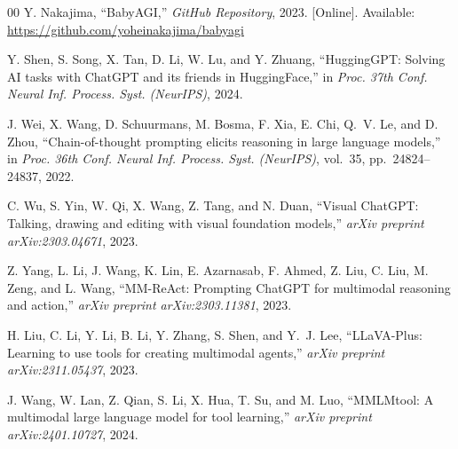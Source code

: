 \documentclass[conference]{IEEEtran}
\begin{document}
\begin{thebibliography}{00}
Y. Nakajima, ``BabyAGI,'' \textit{GitHub Repository}, 2023. [Online]. Available: \url{https://github.com/yoheinakajima/babyagi}

Y. Shen, S. Song, X. Tan, D. Li, W. Lu, and Y. Zhuang, ``HuggingGPT: Solving AI tasks with ChatGPT and its friends in HuggingFace,'' in \textit{Proc. 37th Conf. Neural Inf. Process. Syst. (NeurIPS)}, 2024.

J. Wei, X. Wang, D. Schuurmans, M. Bosma, F. Xia, E. Chi, Q.~V. Le, and D. Zhou, ``Chain-of-thought prompting elicits reasoning in large language models,'' in \textit{Proc. 36th Conf. Neural Inf. Process. Syst. (NeurIPS)}, vol.~35, pp.~24824--24837, 2022.

C. Wu, S. Yin, W. Qi, X. Wang, Z. Tang, and N. Duan, ``Visual ChatGPT: Talking, drawing and editing with visual foundation models,'' \textit{arXiv preprint arXiv:2303.04671}, 2023.

Z. Yang, L. Li, J. Wang, K. Lin, E. Azarnasab, F. Ahmed, Z. Liu, C. Liu, M. Zeng, and L. Wang, ``MM-ReAct: Prompting ChatGPT for multimodal reasoning and action,'' \textit{arXiv preprint arXiv:2303.11381}, 2023.

H. Liu, C. Li, Y. Li, B. Li, Y. Zhang, S. Shen, and Y.~J. Lee, ``LLaVA-Plus: Learning to use tools for creating multimodal agents,'' \textit{arXiv preprint arXiv:2311.05437}, 2023.

J. Wang, W. Lan, Z. Qian, S. Li, X. Hua, T. Su, and M. Luo, ``MMLMtool: A multimodal large language model for tool learning,'' \textit{arXiv preprint arXiv:2401.10727}, 2024.

\end{thebibliography}
\end{document}
